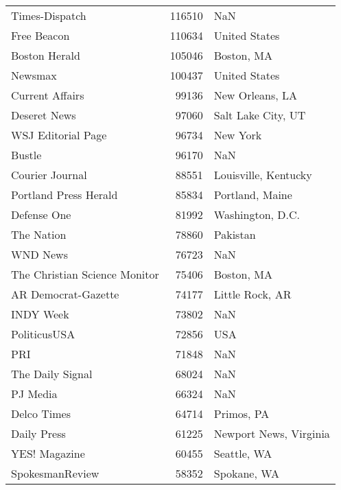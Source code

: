 \begin{longtable}{lrl}
	Times-Dispatch &     116510 &                                   NaN \\
	Free Beacon &     110634 &                         United States \\
	Boston Herald &     105046 &                            Boston, MA \\
	Newsmax &     100437 &                         United States \\
	Current Affairs &      99136 &                       New Orleans, LA \\
	Deseret News &      97060 &                    Salt Lake City, UT \\
	WSJ Editorial Page &      96734 &                              New York \\
	Bustle &      96170 &                                   NaN \\
	Courier Journal &      88551 &                  Louisville, Kentucky \\
	Portland Press Herald &      85834 &                       Portland, Maine \\
	Defense One &      81992 &                      Washington, D.C. \\
	The Nation &      78860 &                              Pakistan \\
	WND News &      76723 &                                   NaN \\
	The Christian Science Monitor &      75406 &                            Boston, MA \\
	AR Democrat-Gazette &      74177 &                       Little Rock, AR \\
	INDY Week &      73802 &                                   NaN \\
	PoliticusUSA &      72856 &                                   USA \\
	PRI &      71848 &                                   NaN \\
	The Daily Signal &      68024 &                                   NaN \\
	PJ Media &      66324 &                                   NaN \\
	Delco Times &      64714 &                            Primos, PA \\
	Daily Press &      61225 &                Newport News, Virginia \\
	YES! Magazine &      60455 &                           Seattle, WA \\
	SpokesmanReview &      58352 &                           Spokane, WA \\

\end{longtable}
